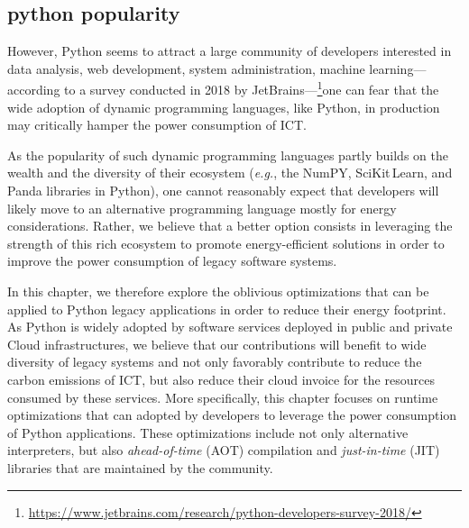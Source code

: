 \subsection{python popularity}

However, Python seems to attract a large community of developers interested in data analysis, web development, system administration, machine learning---according to a survey conducted in 2018 by JetBrains---\footnote{\url{https://www.jetbrains.com/research/python-developers-survey-2018/}}one can fear that the wide adoption of dynamic programming languages, like Python, in production may critically hamper the power consumption of ICT.

As the popularity of such dynamic programming languages partly builds on the wealth and the diversity of their ecosystem (\emph{e.g.}, the NumPY, SciKit\,Learn, and Panda libraries in Python), one cannot reasonably expect that developers will likely move to an alternative programming language mostly for energy considerations.
Rather, we believe that a better option consists in leveraging the strength of this rich ecosystem to promote energy-efficient solutions in order to improve the power consumption of legacy software systems.

In this chapter, we therefore explore the oblivious optimizations that can be applied to Python legacy applications in order to reduce their energy footprint.
As Python is widely adopted by software services deployed in public and private Cloud infrastructures, we believe that our contributions will benefit to wide diversity of legacy systems and not only favorably contribute to reduce the carbon emissions of ICT, but also reduce their cloud invoice for the resources consumed by these services.
More specifically, this chapter focuses on runtime optimizations that can adopted by developers to leverage the power consumption of Python applications.
These optimizations include not only alternative interpreters, but also \emph{ahead-of-time} (AOT) compilation and \emph{just-in-time} (JIT) libraries that are maintained by the community.





